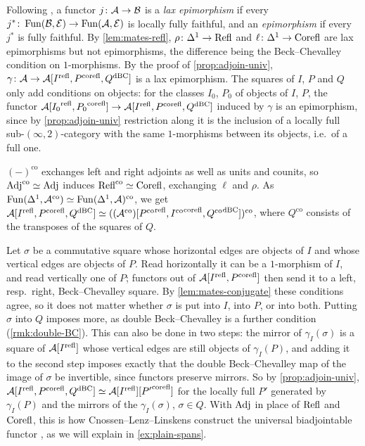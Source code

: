 \begin{rmk}
\label{rmk:lax-epi}
%
Following \cite{adamekelbashirsobralvelebil2001laxepi},
a functor $j\colon \mathcal{A} \to \mathcal{B}$ is a \emph{lax epimorphism} if every
$j^{*}\colon \operatorname{Fun}(\mathcal{B},\mathcal{E}) \to \operatorname{Fun}(\mathcal{A},\mathcal{E})$
is locally fully faithful, and an \emph{epimorphism} if every $j^{*}$ is fully
faithful. By \cref{lem:mates-refl},
$\rho\colon \Delta^{1} \to \mathrm{Refl}$
and
$\ell\colon \Delta^{1} \to \mathrm{Corefl}$
are lax epimorphisms but not epimorphisms,
the difference being the Beck--Chevalley condition on $1$-morphisms.
By the proof of \cref{prop:adjoin-univ},
$\gamma\colon \mathcal{A} \to \mathcal{A}[{I}^{\mathrm{refl}},{P}^{\mathrm{corefl}},{Q}^{\mathrm{dBC}}]$
is a lax epimorphism.
The squares of $I$, $P$ and $Q$ only add conditions on objects:
for the classes $I_{0}$, $P_{0}$ of objects of $I$, $P$, the functor
$\mathcal{A}[{I_{0}}^{\mathrm{refl}},{P_{0}}^{\mathrm{corefl}}] \to \mathcal{A}[{I}^{\mathrm{refl}},{P}^{\mathrm{corefl}},{Q}^{\mathrm{dBC}}]$
induced by $\gamma$ is an epimorphism, since by \cref{prop:adjoin-univ}
restriction along it is the inclusion of a locally full
sub-$(\infty,2)$-category with the same $1$-morphisms between its objects,
i.e.\ of a full one.
\end{rmk}

\begin{rmk}
\label{rmk:adjoin-duality}
%
$(-)^{\mathrm{co}}$ exchanges left and right adjoints as well as units and
counits, so
$\mathrm{Adj}^{\mathrm{co}} \simeq \mathrm{Adj}$
induces
$\mathrm{Refl}^{\mathrm{co}} \simeq \mathrm{Corefl}$,
exchanging $\ell$ and $\rho$. As
$\operatorname{Fun}(\Delta^{1},\mathcal{A}^{\mathrm{co}}) \simeq \operatorname{Fun}(\Delta^{1},\mathcal{A})^{\mathrm{co}}$,
we get
$\mathcal{A}[{I}^{\mathrm{refl}},{P}^{\mathrm{corefl}},{Q}^{\mathrm{dBC}}] \simeq
((\mathcal{A}^{\mathrm{co}})[{P^{\mathrm{co}}}^{\mathrm{refl}},{I^{\mathrm{co}}}^{\mathrm{corefl}},{Q^{\mathrm{co}}}^{\mathrm{dBC}}])^{\mathrm{co}}$,
where $Q^{\mathrm{co}}$ consists of the transposes of the squares of $Q$.
\end{rmk}

\begin{rmk}
\label{rmk:biadjointable}
%
Let $\sigma$ be a commutative square whose horizontal edges are objects of $I$
and whose vertical edges are objects of $P$.
Read horizontally it can be a $1$-morphism of $I$,
and read vertically one of $P$; functors out of $\mathcal{A}[{I}^{\mathrm{refl}},{P}^{\mathrm{corefl}}]$ then send it
to a left, resp.\ right, Beck--Chevalley square.
By \cref{lem:mates-conjugate} these conditions agree,
so it does not matter whether $\sigma$ is put into $I$, into $P$, or into both.
Putting $\sigma$ into $Q$ imposes more, as double Beck--Chevalley is a further
condition (\cref{rmk:double-BC}). This can also be done in two steps:
the mirror of $\gamma_{I}(\sigma)$ is a square of $\mathcal{A}[{I}^{\mathrm{refl}}]$ whose vertical
edges are still objects of $\gamma_{I}(P)$,
and adding it to the second step imposes exactly that the double Beck--Chevalley
map of the image of $\sigma$ be invertible, since functors preserve mirrors.
So by \cref{prop:adjoin-univ},
$\mathcal{A}[{I}^{\mathrm{refl}},{P}^{\mathrm{corefl}},{Q}^{\mathrm{dBC}}] \simeq \mathcal{A}[{I}^{\mathrm{refl}}][{P'}^{\mathrm{corefl}}]$
for the locally full $P'$ generated by $\gamma_{I}(P)$ and the mirrors of the
$\gamma_{I}(\sigma)$, $\sigma \in Q$.
With $\mathrm{Adj}$ in place of $\mathrm{Refl}$ and $\mathrm{Corefl}$,
this is how Cnossen--Lenz--Linskens construct the universal biadjointable
functor \cite[Thm.~2.10]{cnossenlenzlinskens2025universal},
as we will explain in \cref{ex:plain-spans}.
\end{rmk}

